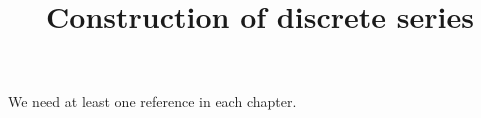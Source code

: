 

%


\title{Construction of discrete series}


\maketitle

\label{section-phantom}

\tableofcontents


We need at least one reference \cite{reference} in each chapter.



















